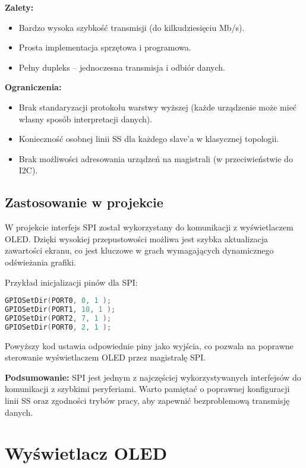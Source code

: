 \documentclass[letterpaper,11pt]{report}
\begin{document}
\textbf{Zalety:}
\begin{itemize}
    \item Bardzo wysoka szybkość transmisji (do kilkudziesięciu Mb/s).
    \item Prosta implementacja sprzętowa i programowa.
    \item Pełny dupleks – jednoczesna transmisja i odbiór danych.
\end{itemize}
\textbf{Ograniczenia:}
\begin{itemize}
    \item Brak standaryzacji protokołu warstwy wyższej (każde urządzenie może mieć własny sposób interpretacji danych).
    \item Konieczność osobnej linii SS dla każdego slave'a w klasycznej topologii.
    \item Brak możliwości adresowania urządzeń na magistrali (w przeciwieństwie do I2C).
\end{itemize}

\subsection{Zastosowanie w projekcie}

W projekcie interfejs SPI został wykorzystany do komunikacji z wyświetlaczem OLED. Dzięki wysokiej przepustowości możliwa jest szybka aktualizacja zawartości ekranu, co jest kluczowe w grach wymagających dynamicznego odświeżania grafiki.
\vspace{5pt}

Przykład inicjalizacji pinów dla SPI:
\begin{lstlisting}[language=C]
GPIOSetDir(PORT0, 0, 1 );
GPIOSetDir(PORT1, 10, 1 );
GPIOSetDir(PORT2, 7, 1 );
GPIOSetDir(PORT0, 2, 1 );
\end{lstlisting}
Powyższy kod ustawia odpowiednie piny jako wyjścia, co pozwala na poprawne sterowanie wyświetlaczem OLED przez magistralę SPI.
\vspace{5pt}

\textbf{Podsumowanie:}  
SPI jest jednym z najczęściej wykorzystywanych interfejsów do komunikacji z szybkimi peryferiami. Warto pamiętać o poprawnej konfiguracji linii SS oraz zgodności trybów pracy, aby zapewnić bezproblemową transmisję danych.

\section{Wyświetlacz OLED}
\end{document}
